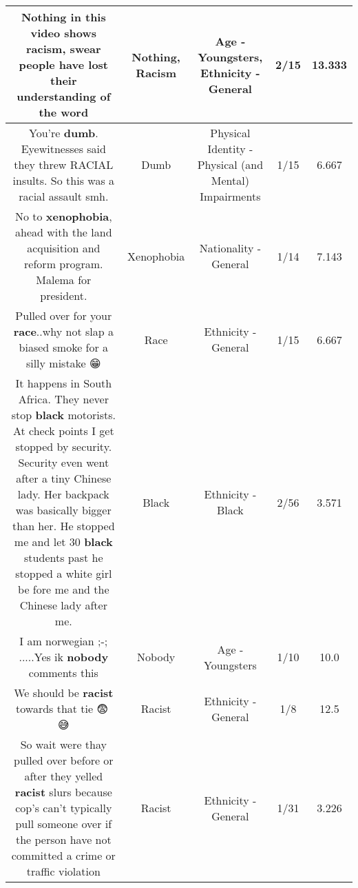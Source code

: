 \documentclass[11pt]{article}
\newlength\mylength
\begin{document}
\begin{center}
\begin{longtable}{|C{.65\mylength}|C{.30\mylength}|C{.12\mylength}|C{.12\mylength}|C{.12\mylength}|}
  \small Nothing in this video shows \textbf{racism}, swear people have lost their understanding of the word\normalsize   & Nothing, Racism & Age - Youngsters, Ethnicity - General & 2/15 & 13.333 \\  \hline
  \small You're \textbf{dumb}. Eyewitnesses said they threw RACIAL insults. So this was a racial assault smh.\normalsize   & Dumb & Physical Identity - Physical (and Mental) Impairments & 1/15 & 6.667 \\  \hline
  \small No to \textbf{xenophobia}, ahead with the land acquisition and reform program. Malema for president.\normalsize   & Xenophobia & Nationality - General & 1/14 & 7.143 \\  \hline
  \small Pulled over for your \textbf{race}..why not slap a biased smoke for a silly mistake 😁\normalsize   & Race & Ethnicity - General & 1/15 & 6.667 \\  \hline
  \small It happens in South Africa. They never stop \textbf{black} motorists. At check points I get stopped by security. Security even went after a tiny Chinese lady. Her backpack was basically bigger than her. He stopped me and let 30 \textbf{black} students past he stopped a white girl be fore me and the Chinese lady after me.\normalsize   & Black & Ethnicity - Black & 2/56 & 3.571 \\  \hline
  \small I am norwegian ;-; .....Yes ik \textbf{nobody} comments this\normalsize   & Nobody & Age - Youngsters & 1/10 & 10.0 \\  \hline
  \small We should be \textbf{racist} towards that tie 😨🥴😅\normalsize   & Racist & Ethnicity - General & 1/8 & 12.5 \\  \hline
  \small So wait were thay pulled over before or after they yelled \textbf{racist} slurs because cop's can't typically pull someone over if the person have not committed a crime or traffic violation\normalsize   & Racist & Ethnicity - General & 1/31 & 3.226 \\  \hline

\end{longtable}
\end{center}
\end{document}
